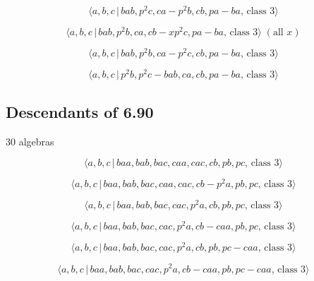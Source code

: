 \documentclass[10pt]{article}
\begin{document}
\begin{equation}
\langle a,b,c\,|\,bab,p^2c,ca-p^2b,cb,pa-ba,\,\text{class }3\rangle 
\tag{7.2664}
\end{equation}

\begin{equation}
\langle a,b,c\,|\,bab,p^2b,ca,cb-xp^2c,pa-ba,\,\text{class }3\rangle \;(%
\text{all }x)  \tag{7.2665}
\end{equation}

\begin{equation}
\langle a,b,c\,|\,bab,p^2b,ca-p^2c,cb,pa-ba,\,\text{class }3\rangle 
\tag{7.2666}
\end{equation}

\begin{equation}
\langle a,b,c\,|\,p^2b,p^2c-bab,ca,cb,pa-ba,\,\text{class }3\rangle 
\tag{7.2667}
\end{equation}

\subsection{Descendants of 6.90}

30 algebras

\begin{equation}
\langle a,b,c\,|\,baa,bab,bac,caa,cac,cb,pb,pc,\,\text{class }3\rangle 
\tag{7.2668}
\end{equation}

\begin{equation}
\langle a,b,c\,|\,baa,bab,bac,caa,cac,cb-p^2a,pb,pc,\,\text{class }3\rangle 
\tag{7.2669}
\end{equation}

\begin{equation}
\langle a,b,c\,|\,baa,bab,bac,cac,p^2a,cb,pb,pc,\,\text{class }3\rangle 
\tag{7.2670}
\end{equation}

\begin{equation}
\langle a,b,c\,|\,baa,bab,bac,cac,p^2a,cb-caa,pb,pc,\,\text{class }3\rangle 
\tag{7.2671}
\end{equation}

\begin{equation}
\langle a,b,c\,|\,baa,bab,bac,cac,p^2a,cb,pb,pc-caa,\,\text{class }3\rangle 
\tag{7.2672}
\end{equation}

\begin{equation}
\langle a,b,c\,|\,baa,bab,bac,cac,p^2a,cb-caa,pb,pc-caa,\,\text{class }%
3\rangle  \tag{7.2673}
\end{equation}
\end{document}
